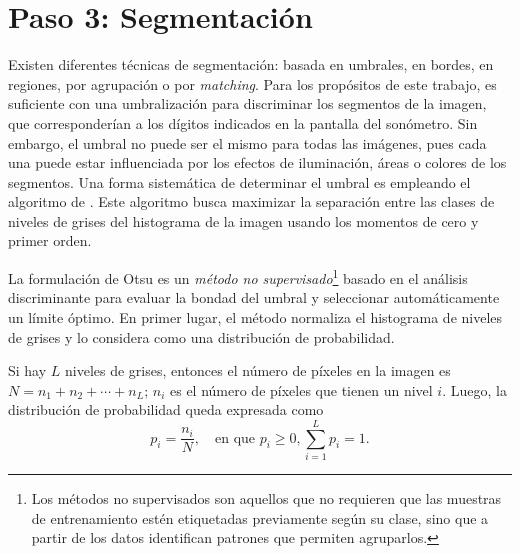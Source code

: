 \section*{Paso 3: Segmentación}
\label{sec:segmentation}
Existen diferentes técnicas de segmentación: basada en umbrales, en bordes, en regiones, por agrupación o por \emph{matching}.
Para los propósitos de este trabajo, es suficiente con una umbralización para discriminar los segmentos de la imagen, que corresponderían a los dígitos indicados en la pantalla del sonómetro.
Sin embargo, el umbral no puede ser el mismo para todas las imágenes, pues cada una puede estar influenciada por los efectos de iluminación, áreas o colores de los segmentos.
Una forma sistemática de determinar el umbral es empleando el algoritmo de \citet{Otsu1979}.
Este algoritmo busca maximizar la separación entre las clases de niveles de grises del histograma de la imagen usando los momentos de cero y primer orden.

La formulación de Otsu es un \emph{método no supervisado}\footnote{Los métodos no supervisados son aquellos que no requieren que las muestras de entrenamiento estén etiquetadas previamente según su clase, sino que a partir de los datos identifican patrones que permiten agruparlos.} basado en el análisis discriminante para evaluar la bondad del umbral y seleccionar automáticamente un límite óptimo.
En primer lugar, el método normaliza el histograma de niveles de grises y lo considera como una distribución de probabilidad.

Si hay $L$ niveles de grises, entonces el número de píxeles en la imagen es $N = n_1 + n_2 + \cdots + n_L$; $n_i$ es el número de píxeles que tienen un nivel $i$.
Luego, la distribución de probabilidad queda expresada como
%
\begin{equation}
    \label{eq:hist_p_distribution}
    p_i = \frac{n_i}{N}, \quad \text{en que } p_i \geq 0, \sum_{i = 1}^L p_i = 1.
\end{equation}

